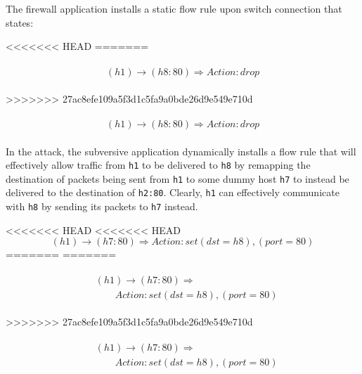 The firewall application installs a static flow rule upon switch connection that states:

<<<<<<< HEAD
=======

\begin{align}
\begin{aligned}
\label{eq:staticfirewall}
(h1) \rightarrow (h8:80) \Rightarrow Action: drop 
\end{aligned}
\end{align}

>>>>>>> 27ac8efe109a5f3d1c5fa9a0bde26d9e549e710d

\begin{align}
\begin{aligned}
\label{eq:staticfirewall}
(h1) \rightarrow (h8:80) \Rightarrow Action: drop 
\end{aligned}
\end{align}


In the attack, the subversive application dynamically installs a flow rule that will effectively allow traffic from \texttt{h1} to be delivered to \texttt{h8} by remapping the destination of packets being sent from \texttt{h1} to some dummy host \texttt{h7} to instead be delivered to the destination of \texttt{h2:80}. Clearly, \texttt{h1} can effectively communicate with \texttt{h8} by sending its packets to \texttt{h7} instead.

<<<<<<< HEAD
<<<<<<< HEAD
\begin{equation}\label{eq:subversive}
(h1) \rightarrow (h7:80) \Rightarrow Action: set (dst = h8), (port = 80)
\end{equation}
=======
=======

\begin{align}
\begin{aligned}
\label{eq:subversive}
&(h1) \rightarrow (h7:80) \Rightarrow  \\
    &\qquad Action: set (dst = h8), (port = 80) 
\end{aligned}
\end{align}

>>>>>>> 27ac8efe109a5f3d1c5fa9a0bde26d9e549e710d

\begin{align}
\begin{aligned}
\label{eq:subversive}
&(h1) \rightarrow (h7:80) \Rightarrow  \\
    &\qquad Action: set (dst = h8), (port = 80) 
\end{aligned}
\end{align}

